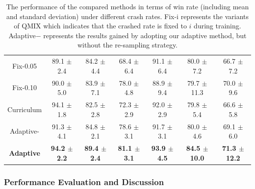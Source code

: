 \documentclass{article}
\begin{document}
\begin{table}[htbp]
{\begin{tabular}{|c|c|c|c|c|c|c|}
		Fix-0.05 & 89.1 $\pm$ 2.4 & 84.2 $\pm$ 4.4 & 68.4 $\pm$ 6.4 & 91.1 $\pm$ 6.4 & 80.0 $\pm$ 7.2 & 66.7 $\pm$ 7.2 \\
		Fix-0.10 & 90.0 $\pm$ 5.0 & 83.9 $\pm$ 7.1 & 78.0 $\pm$ 4.8 & 88.9 $\pm$ 9.4 & 79.7 $\pm$ 11.3 & 70.0 $\pm$ 9.6 \\
		Curriculum & 94.1 $\pm$ 1.8 & 82.5 $\pm$ 2.8 & 72.3 $\pm$ 2.9 & 92.0 $\pm$ 2.9 & 79.8 $\pm$ 5.4 & 66.6 $\pm$ 5.8 \\
		Adaptive- & 91.3 $\pm$ 4.1 & 84.8 $\pm$ 2.1 & 78.6 $\pm$ 3.1 & 91.7 $\pm$ 3.1 & 80.0 $\pm$ 4.6 & 69.1 $\pm$ 6.0 \\
		\hline
		\textbf{Adaptive} & \textbf{94.2 $\pm$ 2.2} & \textbf{89.4 $\pm$ 2.4} & \textbf{81.1 $\pm$ 3.1}  & \textbf{93.9  $\pm$ 4.5} & \textbf{84.5 $\pm$ 10.0} & \textbf{71.3 $\pm$ 12.2} \\
		\hline
	\end{tabular}}
	\caption{The performance of the compared methods in terms of win rate (including mean and standard deviation) under different crash rates.
	Fix-i represents the variants of QMIX which indicates that the crashed rate is fixed to $i$ during training. Adaptive$-$ represents the results gained by adopting our adaptive method, but without the re-sampling strategy.}
	\label{tab:result}
\end{table}

\subsubsection{Performance Evaluation and Discussion}

\end{document}
